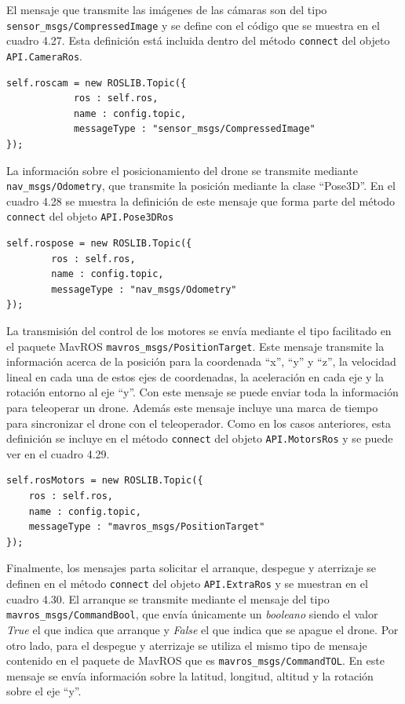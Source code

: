 El mensaje que transmite las imágenes de las cámaras son del tipo \texttt{sensor\_msgs/CompressedImage} y se define con el código que se muestra en el cuadro 4.27. Esta definición está incluida dentro del método \texttt{connect} del objeto \texttt{API.CameraRos}.

\begin{lstlisting}[caption= Definición del mensaje para la información de las cámaras, label=cod.mensajecamdrone]
self.roscam = new ROSLIB.Topic({
            ros : self.ros,
            name : config.topic,
            messageType : "sensor_msgs/CompressedImage"
});
\end{lstlisting}

La información sobre el posicionamiento del drone se transmite mediante \texttt{nav\_msgs/Odometry}, que transmite la posición mediante la clase ``Pose3D''. En el cuadro 4.28 se muestra la definición de este mensaje que forma parte del método \texttt{connect} del objeto \texttt{API.Pose3DRos}

\begin{lstlisting}[caption= Definición del mensaje para obtener el posicionamiento del drone, label=cod.mensajeposedrone]
self.rospose = new ROSLIB.Topic({
		ros : self.ros,
		name : config.topic,
		messageType : "nav_msgs/Odometry"
});
\end{lstlisting}

La transmisión del control de los motores se envía mediante el tipo facilitado en el paquete MavROS \texttt{mavros\_msgs/PositionTarget}. Este mensaje transmite la información acerca de la posición para la coordenada ``x'', ``y'' y ``z'', la velocidad lineal en cada una de estos ejes de coordenadas, la aceleración en cada eje y la rotación entorno al eje ``y''. Con este mensaje se puede enviar toda la información para teleoperar un drone. Además este mensaje incluye una marca de tiempo para sincronizar el drone con el teleoperador. Como en los casos anteriores, esta definición se incluye en el método \texttt{connect} del objeto \texttt{API.MotorsRos} y se puede ver en el cuadro 4.29.

\begin{lstlisting}[caption= Definición del mensaje para controlar los motores del drone, label=cod.mensajemotordrone]
self.rosMotors = new ROSLIB.Topic({
	ros : self.ros,
	name : config.topic,
	messageType : "mavros_msgs/PositionTarget"
});
\end{lstlisting}

Finalmente, los mensajes parta solicitar el arranque, despegue y aterrizaje se definen en el método \texttt{connect} del objeto \texttt{API.ExtraRos} y se muestran en el cuadro 4.30. El arranque se transmite mediante el mensaje del tipo \texttt{mavros\_msgs/CommandBool}, que envía únicamente un \textit{booleano} siendo el valor \textit{True} el que indica que arranque y \textit{False} el que indica que se apague el drone. Por otro lado, para el despegue y aterrizaje se utiliza el mismo tipo de mensaje contenido en el paquete de MavROS que es \texttt{mavros\_msgs/CommandTOL}. En este mensaje se envía información sobre la latitud, longitud, altitud y la rotación sobre el eje ``y''.

